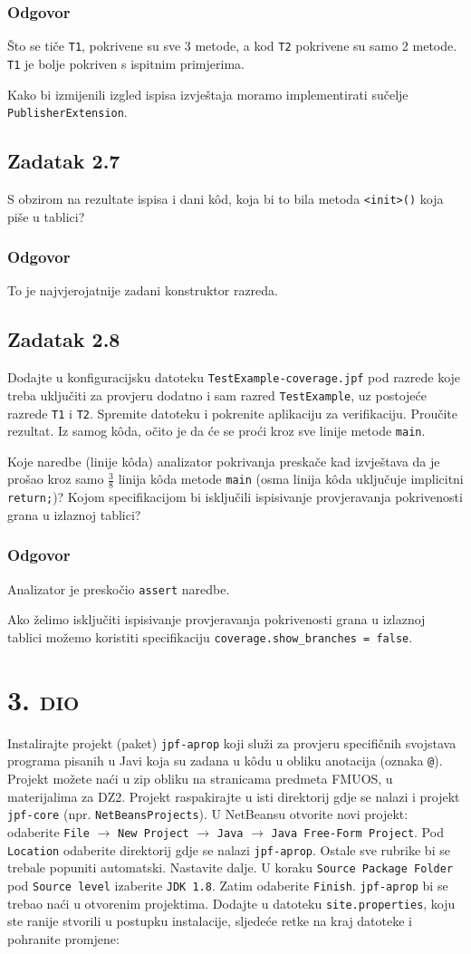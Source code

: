 \documentclass{article}
\newcommand{\sekcija}[1]{\section{\textsc{#1}}}
\newcommand{\dio}[1]{\sekcija{#1. dio}}
\newcommand{\zadatak}[1]{\subsection{Zadatak #1}}
\newcommand{\odgovor}{\subsubsection*{Odgovor}}
\newcommand{\code}[1]{\colorbox{blue!11}{\texttt{#1}}}
\begin{document}
\odgovor

Što se tiče \texttt{T1}, pokrivene su sve 3 metode, a kod \texttt{T2} pokrivene su samo 2 metode. \texttt{T1} je bolje pokriven s ispitnim primjerima.\newline

\noindent
Kako bi izmijenili izgled ispisa izvještaja moramo implementirati sučelje\newline
\texttt{PublisherExtension}.

\zadatak{2.7}

S obzirom na rezultate ispisa i dani kôd, koja bi to bila metoda \code{<init>()} koja piše u tablici? 

\odgovor

To je najvjerojatnije zadani konstruktor razreda.

\zadatak{2.8}

Dodajte u konfiguracijsku datoteku \texttt{TestExample-coverage.jpf} pod razrede koje treba uključiti za provjeru dodatno i sam razred \texttt{TestExample}, uz postojeće razrede \texttt{T1} i \texttt{T2}. Spremite datoteku i pokrenite aplikaciju za verifikaciju. Proučite rezultat. Iz samog kôda, očito je da će se proći kroz sve linije metode \texttt{main}.\newline

\noindent
Koje naredbe (linije kôda) analizator pokrivanja preskače kad izvještava da je prošao kroz samo $\frac{3}{8}$ linija kôda metode \texttt{main} (osma linija kôda uključuje implicitni \code{return;})? Kojom specifikacijom bi isključili ispisivanje provjeravanja pokrivenosti grana u izlaznoj tablici?

\odgovor

Analizator je preskočio \code{assert} naredbe.\newline

\noindent
Ako želimo isključiti ispisivanje provjeravanja pokrivenosti grana u izlaznoj tablici možemo koristiti specifikaciju \code{coverage.show\_branches = false}.

\pagebreak



\dio{3}

Instalirajte projekt (paket) \texttt{jpf-aprop} koji služi za provjeru specifičnih svojstava programa pisanih u Javi koja su zadana u kôdu u obliku anotacija (oznaka \code{@}). Projekt možete naći u zip obliku na stranicama predmeta FMUOS, u materijalima za DZ2. Projekt raspakirajte u isti direktorij gdje se nalazi i projekt \texttt{jpf-core} (npr. \texttt{NetBeansProjects}). U NetBeansu otvorite novi projekt: odaberite \texttt{File} $\rightarrow$ \texttt{New Project} $\rightarrow$ \texttt{Java} $\rightarrow$ \texttt{Java Free-Form Project}. Pod \texttt{Location} odaberite direktorij gdje se nalazi \texttt{jpf-aprop}. Ostale sve rubrike bi se trebale popuniti automatski. Nastavite dalje. U koraku \texttt{Source Package Folder} pod \texttt{Source level} izaberite \texttt{JDK 1.8}. Zatim odaberite \texttt{Finish}. \texttt{jpf-aprop} bi se trebao naći u otvorenim projektima. Dodajte u datoteku \texttt{site.properties}, koju ste ranije stvorili u postupku instalacije, sljedeće retke na kraj datoteke i pohranite promjene:
\end{document}
